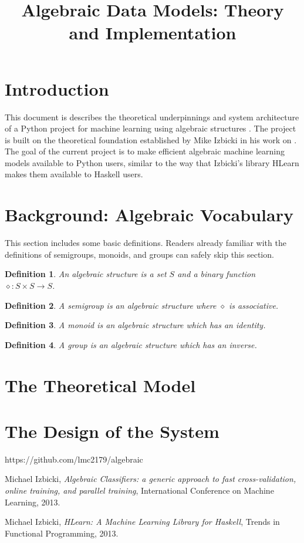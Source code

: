 \documentclass{article}
\begin{document}
\newtheorem{mydef}{Definition}
\title{Algebraic Data Models: Theory and Implementation}
\maketitle
\section{Introduction}
This document is describes the theoretical underpinnings and system architecture of a Python project for machine learning using algebraic structures \cite{algebraic}. The project is built on the theoretical foundation established by Mike Izbicki in his work on \cite{algebraic classifiers}. The goal of the current project is to make efficient algebraic machine learning models available to Python users, similar to the way that Izbicki's library HLearn \cite{hlearn} makes them available to Haskell users.

\section{Background: Algebraic Vocabulary}
This section includes some basic definitions. Readers already familiar with the definitions of semigroups, monoids, and groups can safely skip this section.
\begin{mydef}
An algebraic structure is a set $S$ and a binary function $\diamond: S \times S \rightarrow S$.
\end{mydef}
\begin{mydef}
A semigroup is an algebraic structure where $\diamond$ is associative.
\end{mydef}
\begin{mydef}
A monoid is an algebraic structure which has an identity.
\end{mydef}
\begin{mydef}
A group is an algebraic structure which has an inverse.
\end{mydef}
\section{The Theoretical Model}

\section{The Design of the System}

\begin{thebibliography}{9}

  https://github.com/lmc2179/algebraic
  
  Michael Izbicki,
  \emph{Algebraic Classifiers: a generic approach to fast cross-validation, online training, and parallel training},
    International Conference on Machine Learning,
  2013.

  Michael Izbicki,
  \emph{HLearn: A Machine Learning Library for Haskell},
  Trends in Functional Programming,
  2013.



\end{thebibliography}
\end{document}
